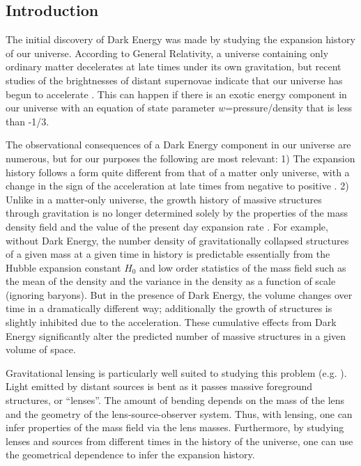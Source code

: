 \documentclass[12pt]{article}
\begin{document}
\subsection{Introduction}

The initial discovery of Dark Energy was made by studying the expansion history
of our universe.  According to General Relativity, a universe containing only
ordinary matter decelerates at late times under its own gravitation, but recent
studies of the brightnesses of distant supernovae indicate that our universe
has begun to accelerate \cite{Riess98,Perlmutter99}.  This can happen if there
is an exotic energy component in our universe with an equation of state
parameter $w$=pressure/density that is less than -1/3.

The observational consequences of a Dark Energy component in our universe are
numerous, but for our purposes the following are most relevant: 1) The
expansion history follows a form quite different from that of a matter only
universe, with a change in the sign of the acceleration at late times from
negative to positive \cite{Carroll92}.  2)  Unlike in a matter-only universe,
the growth history of massive structures through gravitation is no longer
determined solely by the properties of the mass density field and the value of
the present day expansion rate \cite{Haiman01}.  For example, without Dark
Energy, the number density of gravitationally collapsed structures of a given
mass at a given time in history is predictable essentially from the Hubble
expansion constant $H_0$ and low order statistics of the mass field such as the
mean of the density and the variance in the density as a function of scale
(ignoring baryons).  But in the presence of Dark Energy, the volume changes
over time in a dramatically different way; additionally the growth of
structures is slightly inhibited due to the acceleration.  These cumulative
effects from Dark Energy significantly alter the predicted number of massive
structures in a given volume of space.

Gravitational lensing is particularly well suited to studying this problem
(e.g. \cite{Kaiser98,Hu04}).  Light emitted by distant sources is bent as it
passes massive foreground structures, or ``lenses''.  The amount of bending
depends on the mass of the lens and the geometry of the lens-source-observer
system.  Thus, with lensing, one can infer properties of the mass field via the
lens masses. Furthermore, by studying lenses and sources from different times
in the history of the universe, one can use the geometrical dependence to infer
the expansion history.
\end{document}
